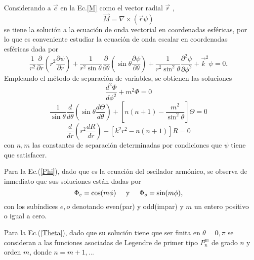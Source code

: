 Considerando a $\Vec{c}$ en la Ec.\ref{M} como el vector radial $\Vec{r}$ ,
$$\Vec{M}=\nabla\times(\Vec{r}\psi)$$
se tiene la solución a la ecuación de onda vectorial en coordenadas esféricas, por lo que es conveniente estudiar la ecuación de onda escalar en coordenadas esféricas dada por
$$\frac{1}{r^2}\frac{\partial}{\partial r}\left(r^2\frac{\partial\psi}{\partial r}\right)+\frac{1}{r^2\sin\theta}\frac{\partial}{\partial\theta}\left(\sin\theta\frac{\partial\psi}{\partial\theta}\right)+\frac{1}{r^2\sin^2\theta}\frac{\partial^2\psi}{\partial\phi^2}+\Vec{k}^2\psi=0.$$
Empleando el método de separación de variables, se obtienen las soluciones
\begin{equation}
    \frac{d^2\Phi}{d\phi^2}+m^2\Phi=0
    \label{Phi}
\end{equation}
\begin{equation}
    \frac{1}{\sin\theta}\frac{d}{d\theta}\left(\sin\theta\frac{d\Theta}{d\theta}\right)+\left[n(n+1)-\frac{m^2}{\sin^2\theta}\right]\Theta=0
    \label{Theta}
\end{equation}
\begin{equation}
    \frac{d}{dr}\left(r^2\frac{dR}{dr}\right)+[k^2r^2-n(n+1)]R=0
    \label{R}
\end{equation}
con $n,m$ las constantes de separación determinadas por condiciones que $\psi$ tiene que satisfacer.

\noindent Para la Ec.(\ref{Phi}), dado que es la ecuación del oscilador armónico, se observa de inmediato que sus soluciones están dadas por
$$\Phi_e=\cos(m\phi)\hspace{0.5cm}\mbox{y}\hspace{0.5cm}\Phi_o=\sin(m\phi),$$
con los subíndices $e,o$ denotando even(par) y odd(impar) y $m$ un entero positivo o igual a cero.

\noindent Para la Ec.(\ref{Theta}), dado que su solución tiene que ser finita en   $\theta=0,\pi$ se consideran a las funciones asociadas de Legendre de primer tipo $P_n^m$ de grado $n$ y orden $m$, donde $n=m+1,...$\\

